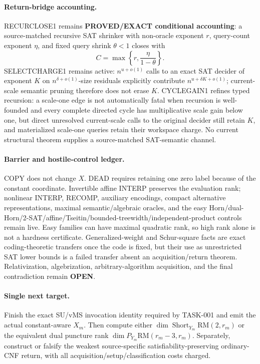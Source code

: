 \documentclass[11pt]{article}
\begin{document}
\paragraph{Return-bridge accounting.}
RECURCLOSE1 remains \textbf{PROVED/EXACT conditional accounting}: a source-matched recursive SAT shrinker with non-oracle exponent \(r\), query-count exponent \(\eta\), and fixed query shrink \(\theta<1\) closes with
\[
 C=\max\left\{r,\frac{\eta}{1-\theta}\right\}.
\]
SELECTCHARGE1 remains active: \(n^{u+o(1)}\) calls to an exact SAT decider of exponent \(K\) on \(n^{\delta+o(1)}\)-size residuals explicitly contribute \(n^{u+\delta K+o(1)}\); current-scale semantic pruning therefore does not erase \(K\).  CYCLEGAIN1 refines typed recursion: a scale-one edge is not automatically fatal when recursion is well-founded and every complete directed cycle has multiplicative scale gain below one, but direct unresolved current-scale calls to the original decider still retain \(K\), and materialized scale-one queries retain their workspace charge.  No current structural theorem supplies a source-matched SAT-semantic channel.

\paragraph{Barrier and hostile-control ledger.}
COPY does not change \(X\).  DEAD requires retaining one zero label because of the constant coordinate.  Invertible affine INTERP preserves the evaluation rank; nonlinear INTERP, RECOMP, auxiliary encodings, compact alternative representations, maximal semantic/algebraic oracles, and the easy Horn/dual-Horn/2-SAT/affine/Tseitin/bounded-treewidth/independent-product controls remain live.  Easy families can have maximal quadratic rank, so high rank alone is not a hardness certificate.  Generalized-weight and Schur-square facts are exact coding-theoretic transfers once the code is fixed, but their use as unrestricted SAT lower bounds is a failed transfer absent an acquisition/return theorem.  Relativization, algebrization, arbitrary-algorithm acquisition, and the final contradiction remain \textbf{OPEN}.

\paragraph{Single next target.}
Finish the exact SU/vMS invocation identity required by TASK-001 and emit the actual constant-aware \(X_m\).  Then compute either \(\dim\operatorname{Short}_{Y_m}\mathrm{RM}(2,r_m)\) or the equivalent dual puncture rank \(\dim P_{Y_m}\mathrm{RM}(r_m-3,r_m)\).  Separately, construct or falsify the weakest source-specific satisfiability-preserving ordinary-CNF return, with all acquisition/setup/classification costs charged.
\end{document}

